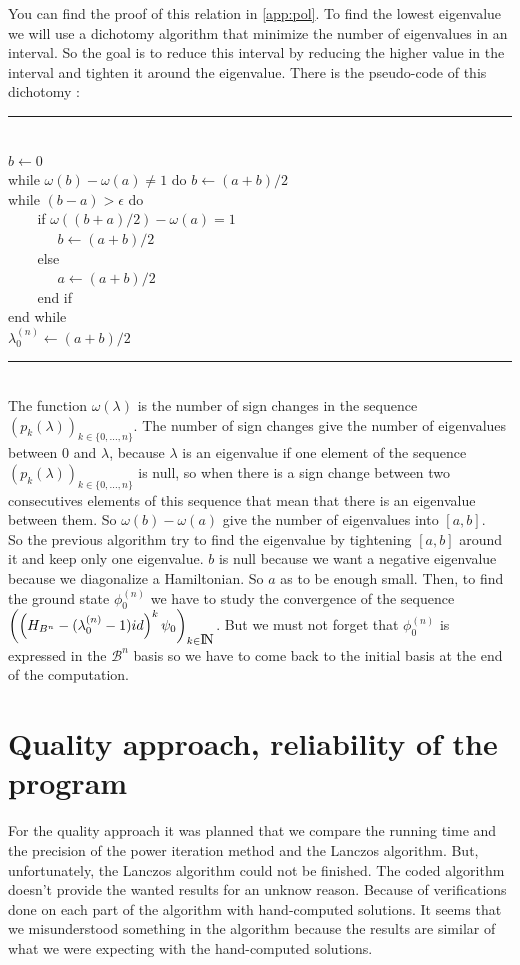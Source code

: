 \documentclass[1pt, a4paper]{article}
\begin{document}
You can find the proof of this relation in \autoref{app:pol}. To find the lowest eigenvalue we will use a dichotomy algorithm that minimize the number of eigenvalues in an interval. So the goal is to reduce this interval by reducing the higher value in the interval and tighten it around the eigenvalue. There is the pseudo-code of this dichotomy :\\
\hrule
\noindent
\\
$b\leftarrow 0$\\
while $\omega(b)-\omega(a)\ne 1$ do $b\leftarrow (a + b)/2$\\
while $(b-a) > \epsilon$ do\\
$~~~~~~~~$ if $\omega ((b+a)/2) - \omega(a) = 1$\\
$~~~~~~~~~~~~~~~~ b\leftarrow (a + b)/2$\\
$~~~~~~~~$ else\\
$~~~~~~~~~~~~~~~~ a\leftarrow (a + b)/2$\\
$~~~~~~~~$ end if\\
end while\\
$\lambda^{(n)}_0 \leftarrow (a + b) / 2$\\
\hrule
\noindent
\\
The function $\omega(\lambda)$ is the number of sign changes in the sequence $(p_k(\lambda))_{k\in \{0,\dots,n\}}$. The number of sign changes give the number of eigenvalues between $0$ and $\lambda$, because $\lambda$ is an eigenvalue if one element of the sequence $(p_k(\lambda))_{k\in \{0,\dots,n\}}$ is null, so when there is a sign change between two consecutives elements of this sequence that mean that there is an eigenvalue between them. So $\omega(b)-\omega(a)$ give the number of eigenvalues into $[a, b]$.\\
So the previous algorithm try to find the eigenvalue by tightening $[a, b]$ around it and keep only one eigenvalue. $b$ is null because we want a negative eigenvalue because we diagonalize a Hamiltonian. So $a$ as to be enough small.
\newpage\noindent
Then, to find the ground state $\phi^{(n)}_0$ we have to study the convergence of the sequence $\left(\left(H_{B^n}-(\lambda_0^{(n)} - 1)id\right)^k\psi_0\right)_{k\in\mbox{I\hspace{-.15em}N}}$. But we must not forget that $\phi^{(n)}_0$ is expressed in the $\mathcal{B}^n$ basis so we have to come back to the initial basis at the end of the computation.
\section{Quality approach, reliability of the program}
\label{sec:qual}
\noindent
For the quality approach it was planned that we compare the running time and the precision of the power iteration method and the Lanczos algorithm. But, unfortunately, the Lanczos algorithm could not be finished. The coded algorithm doesn't provide the wanted results for an unknow reason. Because of verifications done on each part of the algorithm with hand-computed solutions. It seems that we misunderstood something in the algorithm because the results are similar of what we were expecting with the hand-computed solutions.
\end{document}
